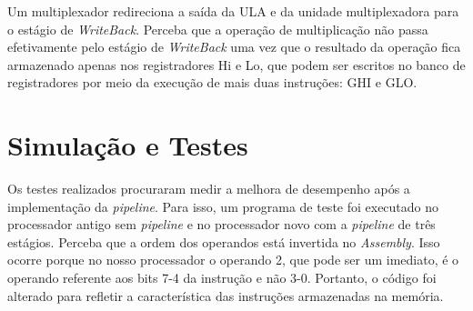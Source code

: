 \documentclass[11pt,a4paper,titlepage]{article}
\begin{document}
Um multiplexador redireciona a saída da ULA e da unidade multiplexadora para o estágio de 
\textit{WriteBack}. Perceba que a operação de multiplicação não passa efetivamente pelo estágio de 
\textit{WriteBack} uma vez que o resultado da operação fica armazenado apenas nos registradores Hi
e Lo, que podem ser escritos no banco de registradores por meio da execução de mais duas 
instruções: GHI e GLO.

\section{Simulação e Testes}

Os testes realizados procuraram medir a melhora de desempenho após a implementação da \textit{pipeline}.
Para isso, um programa de teste foi executado no processador antigo sem \textit{pipeline} e no processador
novo com a \textit{pipeline} de três estágios. Perceba que a ordem dos operandos está invertida no
\textit{Assembly}. Isso ocorre porque no nosso processador o operando 2, que pode ser um imediato, é o
operando referente aos bits 7-4 da instrução e não 3-0. Portanto, o código foi alterado para refletir
a característica das instruções armazenadas na memória.
\end{document}

